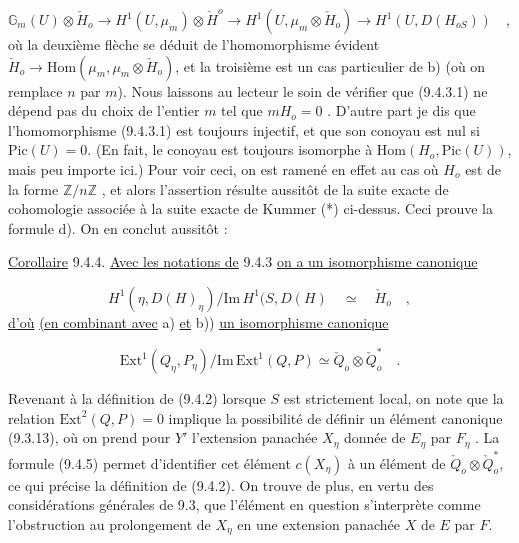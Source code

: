 \begin{equation*}
\mathbb{G}_m(U) \otimes \check{H}_o \longrightarrow H^1(U ,\mu_m) \otimes \check{H}^o \longrightarrow H^1(U,\mu_m \otimes \check{H}_o) \longrightarrow H^1(U, D(H_{oS})) \quad ,
\end{equation*}
où la deuxième flèche se déduit de l'homomorphisme évident $\check{H}_o \longrightarrow \mathrm{Hom}(\mu_m, \mu_m \otimes \check{H}_o)$, et la troisième est un cas particulier de b) (où on remplace $n$ par $m$). Nous laissons au lecteur le soin de vérifier que (9.4.3.1) ne dépend pas du choix de l'entier $m$ tel que $mH_o = 0$ . D'autre part je dis que l'homomorphisme (9.4.3.1) est toujours injectif, et que son conoyau est nul si $\mathrm{Pic}(U) = 0$. (En fait, le conoyau est toujours isomorphe à $\mathrm{Hom}(H_o,\mathrm{Pic}(U))$, mais peu importe ici.) Pour voir ceci, on est ramené en effet au cas où $H_o$ est de la forme $\mathbb{Z}/n\mathbb{Z}$ , et alors l'assertion résulte aussitôt de la suite exacte de cohomologie associée à la suite exacte de Kummer (*) ci-dessus. Ceci prouve la formule d). On en conclut aussitôt :

\underline{Corollaire} 9.4.4. \underline{Avec les notations de} 9.4.3 \underline{on a un isomorphisme canonique}

\begin{equation*}\tag{e)}
H^1(\eta,D(H)_\eta)/ \mathrm{Im}\, H^1(S,D(H) \quad \simeq \quad \check{H}_o \quad ,
\end{equation*}
\underline{d'où} \underline{(en combinant avec} a) \underline{et} b)) \underline{un isomorphisme canonique}

\begin{equation}\tag{9.4.5}
\mathrm{Ext}^1(Q_\eta,P_\eta)/\mathrm{Im}\, \mathrm{Ext}^1(Q,P) \simeq \check{Q}_o \otimes \check{Q}_o^* \quad .
\end{equation}


Revenant à la définition de (9.4.2) lorsque $S$ est strictement local, on note que la relation $\mathrm{Ext}^2(Q,P) = 0$ implique la possibilité de définir un élément canonique (9.3.13), où on prend pour $Y'$ l'extension panachée $X_\eta$ donnée de $E_\eta$ par $F_\eta$ . La formule (9.4.5) permet d'identifier cet élément $c(X_\eta)$ à un élément de $\check{Q}_o \otimes \check{Q}_o^*$, ce qui précise la définition de (9.4.2). On trouve de plus, en vertu des considérations générales de 9.3, que l'élément en question s'interprète comme l'obstruction au prolongement de $X_\eta$ en une extension panachée $X$ de $E$ par $F$.

